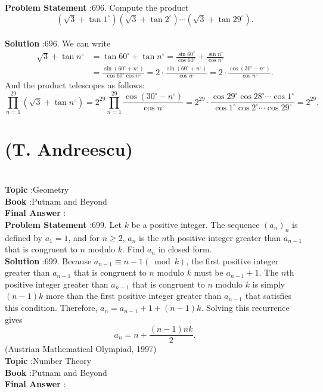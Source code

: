 \documentclass[10pt]{article}
\begin{document}
\textbf{Problem Statement} :696. Compute the product$$ \left(\sqrt{3}+\tan 1^{\circ}\right)\left(\sqrt{3}+\tan 2^{\circ}\right) \cdots\left(\sqrt{3}+\tan 29^{\circ}\right) . $$\\
\textbf{Solution} :696. We can write$$ \begin{aligned} \sqrt{3}+\tan n^{\circ} &=\tan 60^{\circ}+\tan n^{\circ}=\frac{\sin 60^{\circ}}{\cos 60^{\circ}}+\frac{\sin n^{\circ}}{\cos n^{\circ}} \\ &=\frac{\sin \left(60^{\circ}+n^{\circ}\right)}{\cos 60^{\circ} \cos n^{\circ}}=2 \cdot \frac{\sin \left(60^{\circ}+n^{\circ}\right)}{\cos n^{\circ}}=2 \cdot \frac{\cos \left(30^{\circ}-n^{\circ}\right)}{\cos n^{\circ}} . \end{aligned} $$And the product telescopes as follows:$$ \prod_{n=1}^{29}\left(\sqrt{3}+\tan n^{\circ}\right)=2^{29} \prod_{n=1}^{29} \frac{\cos \left(30^{\circ}-n^{\circ}\right)}{\cos n^{\circ}}=2^{29} \cdot \frac{\cos 29^{\circ} \cos 28^{\circ} \cdots \cos 1^{\circ}}{\cos 1^{\circ} \cos 2^{\circ} \cdots \cos 29^{\circ}}=2^{29} . $$\section{(T. Andreescu)}\\
\textbf{Topic} :Geometry\\
\textbf{Book} :Putnam and Beyond\\
\textbf{Final Answer} :\\


\textbf{Problem Statement} :699. Let $k$ be a positive integer. The sequence $\left(a_{n}\right)_{n}$ is defined by $a_{1}=1$, and for $n \geq 2$, $a_{n}$ is the $n$th positive integer greater than $a_{n-1}$ that is congruent to $n$ modulo $k$. Find $a_{n}$ in closed form.\\
\textbf{Solution} :699. Because $a_{n-1} \equiv n-1(\bmod k)$, the first positive integer greater than $a_{n-1}$ that is congruent to $n$ modulo $k$ must be $a_{n-1}+1$. The $n$th positive integer greater than $a_{n-1}$ that is congruent to $n$ modulo $k$ is simply $(n-1) k$ more than the first positive integer greater than $a_{n-1}$ that satisfies this condition. Therefore, $a_{n}=a_{n-1}+1+(n-1) k$. Solving this recurrence gives$$ a_{n}=n+\frac{(n-1) n k}{2} . $$(Austrian Mathematical Olympiad, 1997)\\
\textbf{Topic} :Number Theory\\
\textbf{Book} :Putnam and Beyond\\
\textbf{Final Answer} :\\
\end{document}
